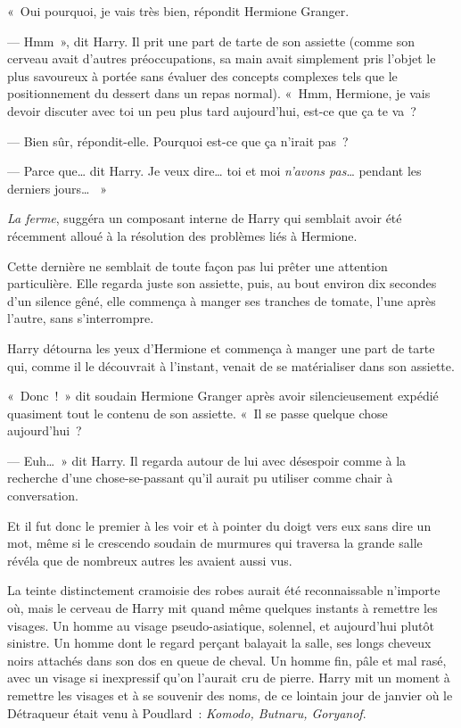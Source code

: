 «~Oui pourquoi, je vais très bien, répondit Hermione Granger.

--- Hmm~», dit Harry. Il prit une part de tarte de son assiette (comme son cerveau avait d'autres préoccupations, sa main avait simplement pris l'objet le plus savoureux à portée sans évaluer des concepts complexes tels que le positionnement du dessert dans un repas normal). «~Hmm, Hermione, je vais devoir discuter avec toi un peu plus tard aujourd'hui, est-ce que ça te va~?

--- Bien sûr, répondit-elle. Pourquoi est-ce que ça n'irait pas~?

--- Parce que… dit Harry. Je veux dire… toi et moi \emph{n'avons pas}… pendant les derniers jours… ~»

\emph{La ferme}, suggéra un composant interne de Harry qui semblait avoir été récemment alloué à la résolution des problèmes liés à Hermione.

Cette dernière ne semblait de toute façon pas lui prêter une attention particulière. Elle regarda juste son assiette, puis, au bout environ dix secondes d'un silence gêné, elle commença à manger ses tranches de tomate, l'une après l'autre, sans s'interrompre.

Harry détourna les yeux d'Hermione et commença à manger une part de tarte qui, comme il le découvrait à l'instant, venait de se matérialiser dans son assiette.

«~Donc~!~» dit soudain Hermione Granger après avoir silencieusement expédié quasiment tout le contenu de son assiette. «~Il se passe quelque chose aujourd'hui~?

--- Euh…~» dit Harry. Il regarda autour de lui avec désespoir comme à la recherche d'une chose-se-passant qu'il aurait pu utiliser comme chair à conversation.

Et il fut donc le premier à les voir et à pointer du doigt vers eux sans dire un mot, même si le crescendo soudain de murmures qui traversa la grande salle révéla que de nombreux autres les avaient aussi vus.

La teinte distinctement cramoisie des robes aurait été reconnaissable n'importe où, mais le cerveau de Harry mit quand même quelques instants à remettre les visages. Un homme au visage pseudo-asiatique, solennel, et aujourd'hui plutôt sinistre. Un homme dont le regard perçant balayait la salle, ses longs cheveux noirs attachés dans son dos en queue de cheval. Un homme fin, pâle et mal rasé, avec un visage si inexpressif qu'on l'aurait cru de pierre. Harry mit un moment à remettre les visages et à se souvenir des noms, de ce lointain jour de janvier où le Détraqueur était venu à Poudlard~: \emph{Komodo, Butnaru, Goryanof}.

